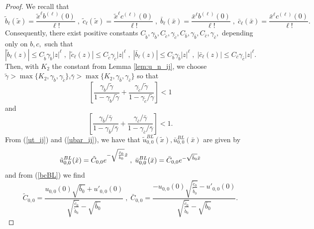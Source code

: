 \documentclass[10pt,a4paper]{amsart}
\begin{document}
\begin{proof}
We recall that
\begin{equation*}
\tilde{b}_{\ell}(\tilde{x}) = \frac{\tilde{x}^{\ell} b^{(\ell)}(0)}{\ell !} \; , \; \tilde{c}_{\ell}(\tilde{x}) = \frac{\tilde{x}^{\ell} c^{(\ell)}(0)}{\ell !} \; , \; \bar{b}_{\ell}(\bar{x}) = \frac{\bar{x}^{\ell} b^{(\ell)}(0)}{\ell !} \; , \; \bar{c}_{\ell}(\bar{x}) = \frac{\bar{x}^{\ell} c^{(\ell)}(0)}{\ell !}.
\end{equation*}
Consequently, there exist positive constants $C_{\tilde{b}}, \gamma _{\tilde{b}}, C_{\tilde{c}}, \gamma _{\tilde{c}}, C_{\bar{b}}, \gamma _{\bar{b}}, C_{\bar{c}}, \gamma _{\bar{c}},$ depending only on $b,c,$ such that
\begin{equation*}
|\tilde{b}_{\ell}(z)| \leq C_{\tilde{b}} \gamma _{\tilde{b}} |z|^{\ell} \; , \; |\tilde{c}_{\ell}(z)| \leq C_{\tilde{c}} \gamma _{\tilde{c}} |z|^{\ell} \; , \; |\bar{b}_{\ell}(z)| \leq C_{\bar{b}} \gamma _{\bar{b}} |z|^{\ell} \; , \; |\bar{c}_{\ell}(z)| \leq C_{\bar{c}} \gamma _{\bar{c}} |z|^{\ell}.
\end{equation*}
Then, with $K_{2}$ the constant from Lemma \ref{lem:u_n_ij}, we choose $\tilde{\gamma } > \max \{ K_{2}, \gamma _{\tilde{b}}, \gamma _{\tilde{c}} \}$,$\bar{\gamma } > \max \{ K_{2}, \gamma _{\bar{b}}, \gamma _{\bar{c}} \}$ so that
\begin{equation*}
\left[ \frac{\gamma _{\tilde{b}} / \tilde{\gamma }}{1 - \gamma _{\tilde{b}} / \tilde{\gamma }} + \frac{\gamma _{\tilde{c}} / \tilde{\gamma }}{1 - \gamma _{\tilde{c}} / \tilde{\gamma }} \right] < 1
\end{equation*}
and
\begin{equation*}
\left[ \frac{\gamma _{\bar{b}} / \bar{\gamma }}{1 - \gamma _{\bar{b}} / \bar{\gamma }} + \frac{\gamma _{\bar{c}} / \bar{\gamma }}{1 - \gamma _{\bar{c}} / \bar{\gamma }} \right] < 1.
\end{equation*}
%
From (\ref{ut_ij}) and (\ref{ubar_ij}), we have that $\tilde{u}^{BL}_{0,0}(\tilde{x}),\bar{u}^{BL}_{0,0}(\bar{x})$ are given by 
\begin{equation*}
\tilde{u}^{BL}_{0,0}(\tilde{x})=\tilde{C}_{0,0}e^{-\sqrt{\frac{\tilde{c}_{0}}{%
\tilde{b}_{0}}}\tilde{x}}\; , \; \bar{u}^{BL}_{0,0}(\bar{x})=\bar{C}_{0,0}e^{-\sqrt{\bar{%
b}_{0}}\bar{x}}
\end{equation*}
and from (\ref{bcBL}) we find
%
\[
\tilde{C}_{0,0} = \frac{u_{0,0}(0) \sqrt{\bar{b}_0}+u'_{0,0}(0)}{\sqrt{\frac{\tilde{c}_0}{\tilde{b}_0}}-\sqrt{\bar{b}_0}} \; , \;
\bar{C}_{0,0} = \frac{-u_{0,0}(0) \sqrt{\frac{\tilde{c}_0}{\tilde{b}_0}}-u'_{0,0}(0)}{\sqrt{\frac{\tilde{c}_0}{\tilde{b}_0}}-\sqrt{\bar{b}_0}}.
\]
\end{proof}
\end{document}
